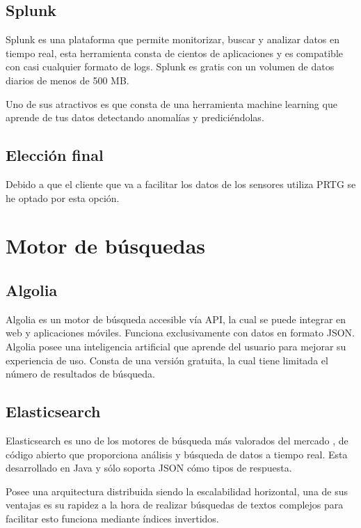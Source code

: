 \subsection{Splunk}
Splunk es una plataforma que permite monitorizar, buscar y analizar datos en tiempo real, esta herramienta consta de cientos de aplicaciones y es compatible con casi cualquier formato de logs. Splunk es gratis con un volumen de datos diarios de menos de 500 MB. \cite{pagina:Splunk}

Uno de sus atractivos es que consta de una herramienta machine learning que aprende de tus datos detectando anomalías y prediciéndolas.

\subsection{Elección final}
Debido a que el cliente que va a facilitar los datos de los sensores utiliza PRTG se he optado por esta opción.

\section{Motor de búsquedas}

\subsection{Algolia}
Algolia es un motor de búsqueda accesible vía API, la cual se puede integrar en web y aplicaciones móviles. Funciona exclusivamente con datos en formato JSON. Algolia posee una inteligencia artificial que aprende del usuario para mejorar su experiencia de uso. Consta de una versión gratuita, la cual tiene limitada el número de resultados de búsqueda.\cite{pagina:Algolia}

\subsection{Elasticsearch}
Elasticsearch es uno de los motores de búsqueda más valorados del mercado\cite{ranking:DB-Engines} , de código abierto que proporciona análisis y búsqueda de datos a tiempo real. Esta desarrollado en Java y sólo soporta JSON cómo tipos de respuesta.

Posee una arquitectura distribuida siendo la escalabilidad horizontal, una de sus ventajas es su rapidez a la hora de realizar búsquedas de textos complejos para facilitar esto funciona mediante índices invertidos.\cite{pagina:ElasticSearch}  

